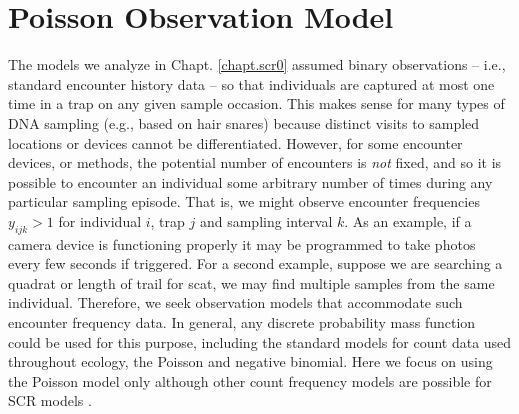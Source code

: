 \section{Poisson Observation Model}
\label{poisson-mn.sec.poisson}

The models we analyze in Chapt. \ref{chapt.scr0} assumed binary
observations -- i.e., standard encounter history data -- so that
individuals are captured at most one time in a trap on any given
sample occasion.  This makes sense for many types of DNA sampling
(e.g., based on hair snares) because distinct visits to sampled
locations or devices cannot be differentiated. However, for some
encounter devices, or methods, the potential number of encounters is
{\it not} fixed, and so it is possible to encounter an individual some
arbitrary number of times during any particular sampling episode.
That is, we might observe encounter frequencies $y_{ijk}>1$ for
individual $i$, trap $j$ and sampling interval $k$.  As an example, if
a camera device is functioning properly it may be programmed to take
photos every few seconds if triggered.  For a second example, suppose
we are searching a quadrat or length of trail for scat, we may find
multiple samples from the same individual.  Therefore, we seek
observation models that accommodate such encounter frequency data.  In
general, any discrete probability mass function could be used for this
purpose, including the standard models for count data used throughout
ecology, the Poisson and negative binomial.  Here we focus on using
the Poisson model only although other count frequency models are
possible for SCR models \citep{efford_etal:2009ecol}.

